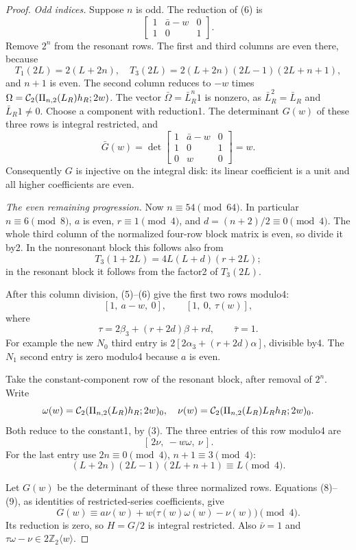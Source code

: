 \documentclass[11pt]{article}
\begin{document}
\begin{proof}
\par\medskip\noindent\textit{Odd indices.}
Suppose $n$ is odd. The reduction of (6) is
\[
 \begin{bmatrix}1&\bar a-w&0\\1&0&1\end{bmatrix}.
\]
Remove $2^n$ from the resonant rows.
The first and third columns are even there, because
\[
 T_1(2L)=2(L+2n),\quad
 T_3(2L)=2(L+2n)(2L-1)(2L+n+1),
\]
and $n+1$ is even.
The second column reduces to $-w$ times
$\Omega={\cal C}_2(\Pi_{n,2}(L_R)h_R;2w)$.
The vector $\bar\Omega=\bar L_R^n1$ is nonzero,
as $\bar L_R^2=\bar L_R$ and $\bar L_R1\ne0$.
Choose a component with reduction1.
The determinant $G(w)$ of these three rows is integral restricted,
and
\[
 \bar G(w)=
 \det\begin{bmatrix}1&\bar a-w&0\\1&0&1\\0&w&0\end{bmatrix}=w.
                                                               \tag{7}
\]
Consequently $G$ is injective on the integral disk: its linear
coefficient is a unit and all higher coefficients are even.

\par\medskip\noindent\textit{The even remaining progression.}
Now $n\equiv54\pmod{64}$.
In particular $n\equiv6\pmod8$, $a$ is even,
$r\equiv1\pmod4$, and $d=(n+2)/2\equiv0\pmod4$.
The whole third column of the normalized four-row block matrix is
even, so divide it by2. In the nonresonant block this follows also from
\[
 T_3(1+2L)=4L(L+d)(r+2L);
\]
in the resonant block it follows from the factor2 of $T_3(2L)$.

After this column division, (5)--(6) give the first two rows modulo4:
\[
 [1,\ a-w,\ 0],\qquad [1,\ 0,\ \tau(w)],
\]
where
\[
 \tau=2\beta_3+(r+2d)\beta+rd,\qquad \bar\tau=1.       \tag{8}
\]
For example the new $N_0$ third entry is
$2[2\alpha_3+(r+2d)\alpha]$, divisible by4.
The $N_1$ second entry is zero modulo4 because $a$ is even.

Take the constant-component row of the resonant block, after
removal of $2^n$.
Write
\[
 \omega(w)={\cal C}_2(\Pi_{n,2}(L_R)h_R;2w)_0,\quad
 \nu(w)={\cal C}_2(\Pi_{n,2}(L_R)L_Rh_R;2w)_0.
\]
Both reduce to the constant1, by (3).
The three entries of this row modulo4 are
\[
 [\,2\nu,\ -w\omega,\ \nu\,].                         \tag{9}
\]
For the last entry use $2n\equiv0\pmod4$, $n+1\equiv3\pmod4$:
\[
 (L+2n)(2L-1)(2L+n+1)\equiv L\pmod4.
\]

Let $G(w)$ be the determinant of these three normalized rows.
Equations (8)--(9), as identities of restricted-series coefficients,
give
\[
 G(w)\equiv a\nu(w)+w\bigl(\tau(w)\omega(w)-\nu(w)\bigr)\pmod4.
                                                               \tag{10}
\]
Its reduction is zero, so $H=G/2$ is integral restricted.
Also $\bar\nu=1$ and $\tau\omega-\nu\in2\mathbb Z_2\langle w\rangle$.


\end{proof}
\end{document}
